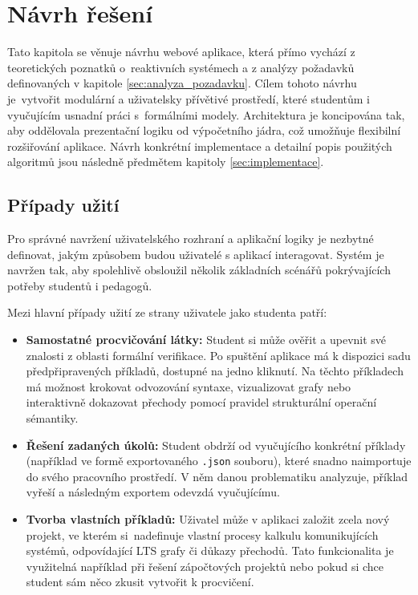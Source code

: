 \chapter{Návrh řešení}
\label{sec:navrh}
Tato kapitola se věnuje návrhu webové aplikace, která přímo vychází z teoretických poznatků o~reaktivních systémech a z analýzy požadavků definovaných v kapitole \ref{sec:analyza_pozadavku}. 
Cílem tohoto návrhu je~vytvořit modulární a uživatelsky přívětivé prostředí, které studentům i vyučujícím usnadní práci s~formálními modely. 
Architektura je koncipována tak, aby oddělovala prezentační logiku od výpočetního jádra, což umožňuje flexibilní rozšiřování aplikace. 
Návrh konkrétní implementace a detailní popis použitých algoritmů jsou následně předmětem kapitoly \ref{sec:implementace}.

\section{Případy užití}

Pro správné navržení uživatelského rozhraní a aplikační logiky je nezbytné definovat, jakým způsobem budou uživatelé s aplikací interagovat. 
Systém je navržen tak, aby spolehlivě obsloužil několik základních scénářů pokrývajících potřeby studentů i pedagogů. 

Mezi hlavní případy užití ze strany uživatele jako studenta patří:
\begin{itemize}
    \item \textbf{Samostatné procvičování látky:} 
    Student si může ověřit a upevnit své znalosti z oblasti formální verifikace. 
    Po spuštění aplikace má k dispozici sadu předpřipravených příkladů, dostupné na jedno kliknutí. 
    Na těchto příkladech má možnost krokovat odvozování syntaxe, vizualizovat grafy nebo interaktivně dokazovat přechody pomocí pravidel strukturální operační sémantiky.
    \item \textbf{Řešení zadaných úkolů:} 
    Student obdrží od vyučujícího konkrétní příklady (například ve formě exportovaného \texttt{.json} souboru), které snadno naimportuje do svého pracovního prostředí. 
    V něm danou problematiku analyzuje, příklad vyřeší a následným exportem odevzdá vyučujícímu.
    \item \textbf{Tvorba vlastních příkladů:} 
    Uživatel může v aplikaci založit zcela nový projekt, ve kterém si~nadefinuje vlastní procesy kalkulu komunikujících systémů, odpovídající LTS grafy či důkazy přechodů. 
    Tato funkcionalita je využitelná například při řešení zápočtových projektů nebo pokud si chce student sám něco zkusit vytvořit k procvičení.
\end{itemize}

